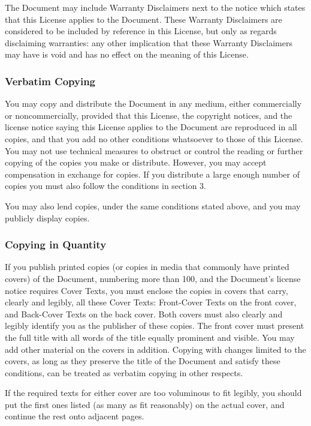 The Document may include Warranty Disclaimers next to the notice which
states that this License applies to the Document.  These Warranty
Disclaimers are considered to be included by reference in this
License, but only as regards disclaiming warranties: any other
implication that these Warranty Disclaimers may have is void and has
no effect on the meaning of this License.

\subsubsection{Verbatim Copying}

You may copy and distribute the Document in any medium, either
commercially or noncommercially, provided that this License, the
copyright notices, and the license notice saying this License applies
to the Document are reproduced in all copies, and that you add no other
conditions whatsoever to those of this License.  You may not use
technical measures to obstruct or control the reading or further
copying of the copies you make or distribute.  However, you may accept
compensation in exchange for copies.  If you distribute a large enough
number of copies you must also follow the conditions in section 3.

You may also lend copies, under the same conditions stated above, and
you may publicly display copies.

\subsubsection{Copying in Quantity}

If you publish printed copies (or copies in media that commonly have
printed covers) of the Document, numbering more than 100, and the
Document's license notice requires Cover Texts, you must enclose the
copies in covers that carry, clearly and legibly, all these Cover
Texts: Front-Cover Texts on the front cover, and Back-Cover Texts on
the back cover.  Both covers must also clearly and legibly identify
you as the publisher of these copies.  The front cover must present
the full title with all words of the title equally prominent and
visible.  You may add other material on the covers in addition.
Copying with changes limited to the covers, as long as they preserve
the title of the Document and satisfy these conditions, can be treated
as verbatim copying in other respects.

If the required texts for either cover are too voluminous to fit
legibly, you should put the first ones listed (as many as fit
reasonably) on the actual cover, and continue the rest onto adjacent
pages.

